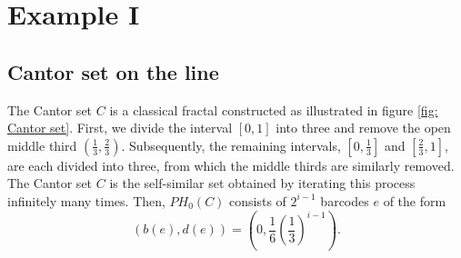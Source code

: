\documentclass[12pt]{amsart}
\numberwithin{equation}{section}
\def\I{{\rm I}}
\begin{document}
\section{Example \I}

\subsection{Cantor set on the line}
    The Cantor set $C$ is a classical fractal constructed as illustrated in figure \ref{fig: Cantor set}. 
    First, we divide the interval $[0,1]$ into three and remove the open middle third $(\frac{1}{3}, \frac{2}{3})$. 
    Subsequently, the remaining intervals, $\left[0, \frac{1}{3}\right]$ and $\left[\frac{2}{3},1\right]$, are each divided into three, from which the middle thirds are similarly removed. 
    The Cantor set $C$ is the self-similar set obtained by iterating this process infinitely many times. 
    Then, $PH_0 (C)$ consists of $2^{i-1}$ barcodes $e$ of the form
    \begin{equation*}
        \left(b(e), d(e)\right) = \left(0,\frac{1}{6}\left( \frac{1}{3}\right)^{i-1} \right).
    \end{equation*}
\end{document}
